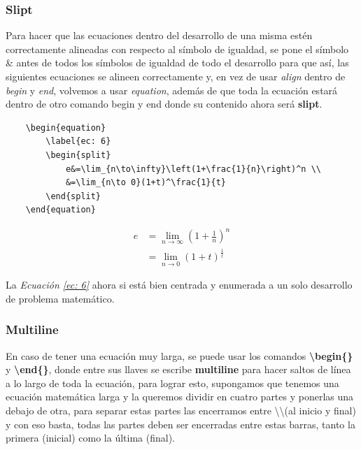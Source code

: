 \subsubsection{Slipt}
\hspace{0.55cm}Para hacer que las ecuaciones dentro del desarrollo de una misma estén correctamente alineadas con respecto al símbolo de igualdad, se pone el símbolo \& antes de todos los símbolos de igualdad de todo el desarrollo para que así, las siguientes ecuaciones se alineen correctamente y, en vez de usar \textit{align} dentro de \textit{begin} y \textit{end}, volvemos a usar \textit{equation}, además de que toda la ecuación estará dentro de otro comando begin y end donde su contenido ahora será \textbf{slipt}.
\begin{lstlisting}
    \begin{equation}
        \label{ec: 6}
        \begin{split}
            e&=\lim_{n\to\infty}\left(1+\frac{1}{n}\right)^n \\
            &=\lim_{n\to 0}(1+t)^\frac{1}{t}
        \end{split}
    \end{equation}
\end{lstlisting}
\begin{equation}
    \label{ec: 6}
    \begin{split}
        e&=\lim_{n\to\infty}\left(1+\frac{1}{n}\right)^n \\
        &=\lim_{n\to 0}(1+t)^\frac{1}{t}
    \end{split}
\end{equation}

La \textit{Ecuación \ref{ec: 6}} ahora si está bien centrada y enumerada a un solo desarrollo de problema matemático.


\subsubsection{Multiline}
\hspace{0.55cm}En caso de tener una ecuación muy larga, se puede usar los comandos \textbf{\textbackslash{begin\{\}}} y \textbf{\textbackslash{end\{\}}}, donde entre sus llaves se escribe \textbf{multiline} para hacer saltos de línea a lo largo de toda la ecuación, para lograr esto, supongamos que tenemos una ecuación matemática larga y la queremos dividir en cuatro partes y ponerlas una debajo de otra, para separar estas partes las encerramos entre \textbackslash\textbackslash (al inicio y final) y con eso basta, todas las partes deben ser encerradas entre estas barras, tanto la primera (inicial) como la última (final).

